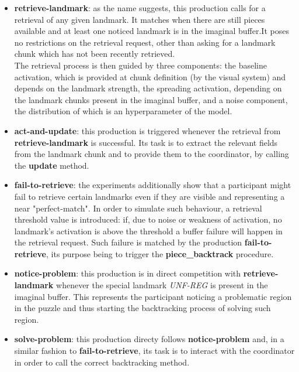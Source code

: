 \documentclass[a4paper,singleside,12pt]{report} %
\begin{document}
	\begin{itemize}
	    \item \textbf{retrieve-landmark}: as the name suggests, this production calls for a retrieval of any given landmark. It matches when there are still pieces available and at least one noticed landmark is in the imaginal buffer.It poses no restrictions on the retrieval request, other than asking for a landmark chunk which has not been recently retrieved.\\
	    The retrieval process is then guided by three components: the baseline activation, which is provided at chunk definition (by the visual system) and depends on the landmark strength, the spreading activation, depending on the landmark chunks present in the imaginal buffer, and a noise component, the distribution of which is an hyperparameter of the model.\\
	    \item \textbf{act-and-update}: this production is triggered whenever the retrieval from \textbf{retrieve-landmark} is successful. Its task is to extract the relevant fields from the landmark chunk and to provide them to the coordinator, by calling the \textbf{update} method.\\
	    \item \textbf{fail-to-retrieve}: the experiments additionally show that a participant might fail to retrieve certain landmarks even if they are visible and representing a near "perfect-match". In order to simulate such behaviour, a retrieval threshold value is introduced: if, due to noise or weakness of activation, no landmark's activation is above the threshold a buffer failure will happen in the retrieval request. Such failure is matched by the production \textbf{fail-to-retrieve}, its purpose being to trigger the \textbf{piece\_backtrack} procedure.
	    \item \textbf{notice-problem}: this production is in direct competition with \textbf{retrieve-landmark} whenever the special landmark \textit{UNF-REG} is present in the imaginal buffer. This represents the participant noticing a problematic region in the puzzle and thus starting the backtracking process of solving such region.
	    \item \textbf{solve-problem}: this production directy follows \textbf{notice-problem} and, in a similar fashion to \textbf{fail-to-retrieve}, its task is to interact with the coordinator in order to call the correct backtracking method.\\
	    
	\end{itemize}
\end{document}
